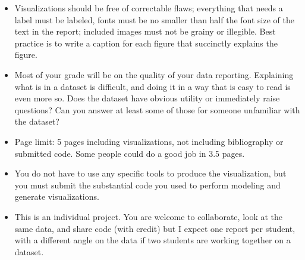 \documentclass[]{book}
\theoremstyle{definition}
\begin{document}
\begin{itemize}

\item Visualizations should be free of correctable flaws; everything that needs a label must be labeled, fonts must be no smaller than half the font size of the text in the report; included images must not be grainy or illegible.  Best practice is to write a caption for each figure that succinctly explains the figure.

\item Most of your grade will be on the quality of your data reporting. Explaining what is in a dataset is difficult, and doing it in a way that is easy to read is even more so.  Does the dataset have obvious utility or immediately raise questions?  Can you answer at least some of those for someone unfamiliar with the dataset?

\item Page limit: 5 pages including visualizations, not including bibliography or submitted code.  Some people could do a good job in 3.5 pages.

\item You do not have to use any specific tools to produce the visualization, but you must submit the substantial code you used to perform modeling and generate visualizations.  

\item This is an individual project.  You are welcome to collaborate, look at the same data, and share code (with credit) but I expect one report per student, with a different angle on the data if two students are working together on a dataset.  

\end{itemize}



\end{document}
